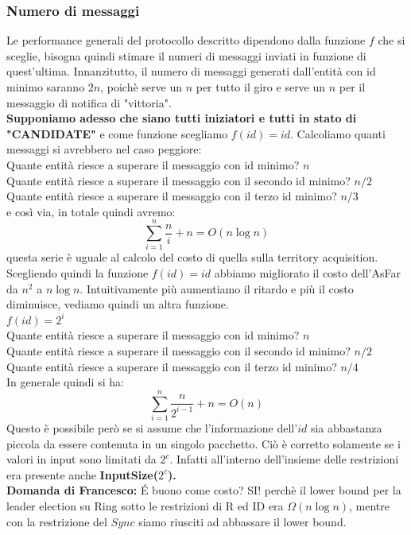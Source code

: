 \subsubsection{Numero di messaggi}
Le performance generali del protocollo descritto dipendono dalla funzione $f$ che si sceglie, bisogna quindi stimare il numeri di messaggi inviati in funzione di quest'ultima. Innanzitutto, il numero di messaggi generati dall'entità con id minimo saranno $2n$, poichè serve un $n$ per tutto il giro e serve un $n$ per il messaggio di notifica di "vittoria".\\
\textbf{Supponiamo adesso che siano tutti iniziatori e tutti in stato di "CANDIDATE"} e come funzione scegliamo \textbf{$f(id) = id$}. Calcoliamo quanti messaggi si avrebbero nel caso peggiore:\\
Quante entità riesce a superare il messaggio con id minimo? $n$\\
Quante entità riesce a superare il messaggio con il secondo id minimo? $n/2$\\
Quante entità riesce a superare il messaggio con il terzo id minimo? $n/3$\\
e così via, in totale quindi avremo: $$\sum_{i=1}^{n}\frac{n}{i} + n = O(n \log n)$$ questa serie è uguale al calcolo del costo di quella sulla territory acquisition. Scegliendo quindi la funzione $f(id) = id$ abbiamo migliorato il costo dell'AsFar da $n^2$ a $n \log n$. Intuitivamente più aumentiamo il ritardo e più il costo diminuisce, vediamo quindi un altra funzione.\\
$f(id) = 2^i$\\
Quante entità riesce a superare il messaggio con id minimo? $n$\\
Quante entità riesce a superare il messaggio con il secondo id minimo? $n/2$\\
Quante entità riesce a superare il messaggio con il terzo id minimo? $n/4$\\
In generale quindi si ha:
$$\sum_{i=1}^{n}\frac{n}{2^{i-1}}  +n = O(n)$$
Questo è possibile però se si assume che l'informazione dell'$id$ sia abbastanza piccola da essere contenuta in un singolo pacchetto. Ciò è corretto solamente se i valori in input sono limitati da $2^c$. Infatti all'interno dell'insieme delle restrizioni era presente anche \textbf{InputSize($2^c$).}\\
\textbf{Domanda di Francesco:}
\'E buono come costo? SI! perchè il lower bound per la leader election su Ring sotto le restrizioni di R ed ID era $\Omega(n \log n)$, mentre con la restrizione del $Sync$ siamo riusciti ad abbassare il lower bound.\\
